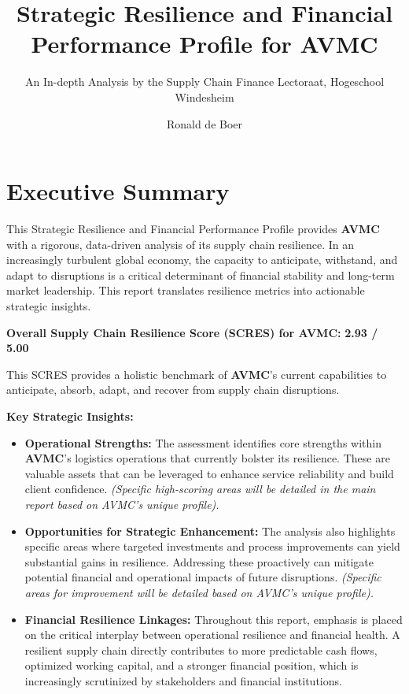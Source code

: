 \documentclass[
  oneside,
  open=any,
  fontsize=11pt]{scrbook}
\title{Strategic Resilience and Financial Performance Profile for AVMC}
\subtitle{An In-depth Analysis by the Supply Chain Finance Lectoraat,
Hogeschool Windesheim}
\author{Ronald de Boer}
\date{}
\providecommand{\tightlist}{%
  \setlength{\itemsep}{0pt}\setlength{\parskip}{0pt}}
\renewcommand*\contentsname{Table of contents}
\newcommand\contentsname{Table of contents}
\begin{document}
\frontmatter
\maketitle

\renewcommand*\contentsname{Table of contents}
{
\setcounter{tocdepth}{2}
\tableofcontents
}
\listoffigures
\listoftables

\mainmatter
\newpage

\chapter{Executive Summary}\label{executive-summary}

This Strategic Resilience and Financial Performance Profile provides
\textbf{AVMC} with a rigorous, data-driven analysis of its supply chain
resilience. In an increasingly turbulent global economy, the capacity to
anticipate, withstand, and adapt to disruptions is a critical
determinant of financial stability and long-term market leadership. This
report translates resilience metrics into actionable strategic insights.

\textbf{Overall Supply Chain Resilience Score (SCRES) for AVMC:}
\textbf{2.93 / 5.00}

This SCRES provides a holistic benchmark of \textbf{AVMC}'s current
capabilities to anticipate, absorb, adapt, and recover from supply chain
disruptions.

\textbf{Key Strategic Insights:}

\begin{itemize}
\tightlist
\item
  \textbf{Operational Strengths:} The assessment identifies core
  strengths within \textbf{AVMC}'s logistics operations that currently
  bolster its resilience. These are valuable assets that can be
  leveraged to enhance service reliability and build client confidence.
  \emph{(Specific high-scoring areas will be detailed in the main report
  based on AVMC's unique profile).}
\item
  \textbf{Opportunities for Strategic Enhancement:} The analysis also
  highlights specific areas where targeted investments and process
  improvements can yield substantial gains in resilience. Addressing
  these proactively can mitigate potential financial and operational
  impacts of future disruptions. \emph{(Specific areas for improvement
  will be detailed based on AVMC's unique profile).}
\item
  \textbf{Financial Resilience Linkages:} Throughout this report,
  emphasis is placed on the critical interplay between operational
  resilience and financial health. A resilient supply chain directly
  contributes to more predictable cash flows, optimized working capital,
  and a stronger financial position, which is increasingly scrutinized
  by stakeholders and financial institutions.
\end{itemize}
\end{document}
